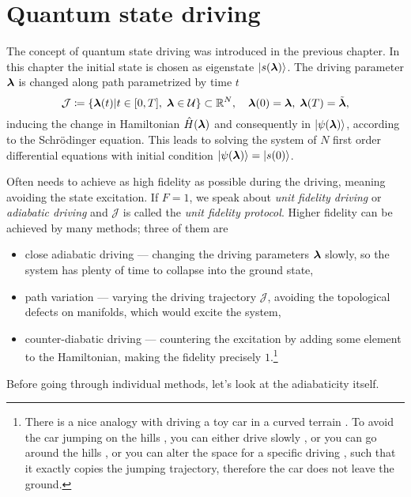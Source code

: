 \chapter{Quantum state driving}
\label{chap:typesOfDriving}
The concept of quantum state driving was introduced in the previous chapter. In this chapter the initial state is chosen as eigenstate $\ket{s({\bm\lambda})}$. The driving parameter ${\bm\lambda}$ is changed along path parametrized by time $t$
\begin{equation}
    \mathcal J\coloneqq\{{\bm\lambda}(t)|t\in[0,T],\; {\bm\lambda}\in \mathcal U\} \subset \mathbb{R}^N,\quad {\bm\lambda}(0)={\bm\lambda},\; {\bm\lambda}(T)=\tilde{{\bm\lambda}},
    \label{eq:defJ_QSdriving}
\end{equation}
inducing the change in Hamiltonian $\hat{H}({\bm\lambda})$ and consequently in $\ket{\psi({\bm\lambda})}$, according to the Schr\"odinger equation. This leads to solving the system of $N$ first order differential equations with initial condition $\ket{\psi({\bm\lambda})}=\ket{s(0)}$.

Often needs to achieve as high fidelity as possible during the driving, meaning avoiding the state excitation. If $F=1$, we speak about \emph{unit fidelity driving} or \emph{adiabatic driving} and $\mathcal J$ is called the \emph{unit fidelity protocol}. Higher fidelity can be achieved by many methods; three of them are
\begin{itemize}
    \item close adiabatic driving — changing the driving parameters ${\bm\lambda}$ slowly, so the system has plenty of time to collapse into the ground state,
    \item path variation — varying the driving trajectory $\mathcal J$, avoiding the topological defects on manifolds, which would excite the system,
    \item counter-diabatic driving — countering the excitation by adding some element to the Hamiltonian, making the fidelity precisely $1$.\footnote{There is a nice analogy with driving a toy car  in a curved terrain . To avoid the car jumping on the hills , you can either drive slowly , or you can go around the hills , or you can alter the space for a specific driving , such that it exactly copies the jumping trajectory, therefore the car does not leave the ground.}
\end{itemize}

Before going through individual methods, let's look at the adiabaticity itself.

